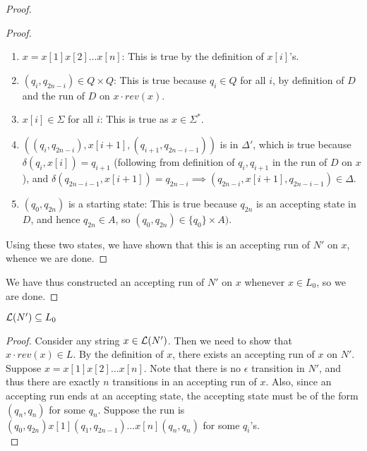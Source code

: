 \begin{soln}
\begin{proof}
\begin{proof}
\begin{enumerate}
                    \begin{enumerate}
                        \item $x = x[1] x[2] \ldots x[n]$: This is true by the definition of $x[i]$'s.
                        \item $(q_i, q_{2n-i}) \in Q \times Q$: This is true because $q_i \in Q$ for all $i$, by definition of $D$ and the run of $D$ on $x \cdot rev(x)$.
                        \item $x[i] \in \Sigma$ for all $i$: This is true as $x \in \Sigma^*$.
                        \item $((q_i, q_{2n-i}), x[i+1], (q_{i+1}, q_{2n-i-1}))$ is in $\Delta'$, which is true because $\delta(q_i, x[i]) = q_{i+1}$ (following from definition of $q_i, q_{i+1}$ in the run of $D$ on $x$), and $\delta(q_{2n-i-1}, x[i+1]) = q_{2n-i} \implies (q_{2n-i}, x[i+1], q_{2n-i-1}) \in \Delta$.
                        \item $(q_0, q_{2n})$ is a starting state: This is true because $q_{2n}$ is an accepting state in $D$, and hence $q_{2n} \in A$, so $(q_0, q_{2n}) \in \{q_0\} \times A)$.
                    \end{enumerate}
            \end{enumerate}
            Using these two states, we have shown that this is an accepting run of $N'$ on $x$, whence we are done.
        \end{proof}
        We have thus constructed an accepting run of $N'$ on $x$ whenever $x \in L_0$, so we are done.
    \end{proof}

    \begin{claim}
        $\mathcal{L}(N') \subseteq L_0$
    \end{claim}

    \begin{proof}
        Consider any string $x \in \mathcal{L}(N')$. Then we need to show that $x \cdot rev(x) \in L$. By the definition of $x$, there exists an accepting run of $x$ on $N'$.\\

        Suppose $x = x[1] x[2] \ldots x[n]$. Note that there is no $\epsilon$ transition in $N'$, and thus there are exactly $n$ transitions in an accepting run of $x$. Also, since an
        accepting run ends at an accepting state, the accepting state must be of the form $(q_n, q_n)$ for some $q_n$. Suppose the run is $(q_0, q_{2n}) x[1] (q_1, q_{2n-1}) \ldots x[n] (q_n, q_n)$
        for some $q_i$'s.\\


\end{proof}
\end{soln}
